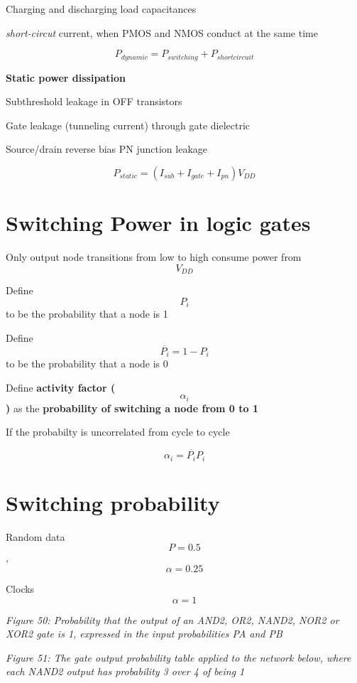 Charging and discharging load capacitances

\emph{short-circut} current, when PMOS and NMOS conduct at the same time

\[P_{dynamic} = P_{switching} + P_{short circuit}\]

\textbf{Static power dissipation}

Subthreshold leakage in OFF transistors

Gate leakage (tunneling current) through gate dielectric

Source/drain reverse bias PN junction leakage

\[P_{static} = \left( I_{sub} + I_{gate} + I_{pn} \right) V_{DD}\]

\section{Switching Power in logic
gates}\label{switching-power-in-logic-gates}

Only output node transitions from low to high consume power from
\[V_{DD}\]

Define \[P_i\] to be the probability that a node is 1

Define \[\overline{P_i} = 1 - P_i\] to be the probability that a node is
0

Define \textbf{activity factor (\[\alpha_i\])} as the
\textbf{probability of switching a node from 0 to 1}

If the probabilty is uncorrelated from cycle to cycle

\[\alpha_i = \overline{P_i}P_i\]

\section{Switching probability}\label{switching-probability}

Random data \[P = 0.5\], \[\alpha = 0.25\]

Clocks \[\alpha = 1\]


{
\centering
{}
}

\emph{Figure 50: Probability that the output of an AND2, OR2, NAND2,
NOR2 or XOR2 gate is 1, expressed in the input probabilities PA and PB}


{
\centering
{}
}

\emph{Figure 51: The gate output probability table applied to the
network below, where each NAND2 output has probability 3 over 4 of being
1}


